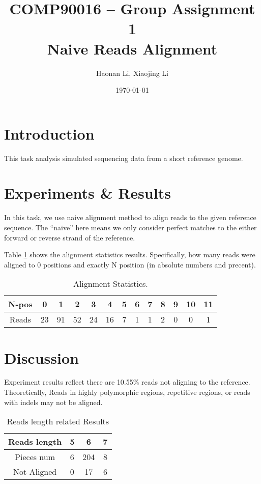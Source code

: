 \documentclass[a4paper]{article}
\title{\bfseries{COMP90016 -- Group Assignment 1 \\ 
	Naive  Reads Alignment}}
\author{Haonan Li, Xiaojing Li}
\date{\today}
\begin{document}
\maketitle

\section{Introduction}
\label{sec:introduction}

This task analysis simulated sequencing data from a short reference genome.

\section{Experiments \& Results}
\label{sec:experiment}

In this task, we use naive alignment method to align reads to the given reference sequence. The ``naive'' here means we only consider perfect matches to the either forward or reverse strand of the reference. 

Table \ref{tab:alignments} shows the alignment statistics results.  Specifically, how many reads were aligned to 0 positions and exactly N position (in absolute numbers and precent). 

\begin{table}[H]
	\centering
	\begin{tabular}{c|c|c|c|c|c|c|c|c|c|c|c|c}
		\hline
		N-pos & 0 & 1 & 2 & 3 & 4 & 5 & 6 & 7 & 8 & 9 & 10 & 11 \\
		\hline
		Reads & 23 & 91 & 52 & 24 & 16 & 7 & 1 & 1 & 2 & 0 & 0 & 1 \\
		\hline
	\end{tabular}
	\caption{\label{tab:alignments}Alignment Statistics. }
\end{table}

\section{Discussion}
\label{sec:discussion}
Experiment results reflect there are 10.55\% reads not aligning to the reference. Theoretically, Reads in highly polymorphic regions, repetitive regions, or reads with indels may not be aligned.

\begin{table}[H]
	\centering
	\begin{tabular}{c|c|c|c}
		\hline
		Reads length & 5 & 6 & 7\\
		\hline
		Pieces num & 6 & 204 & 8 \\
		\hline
		Not Aligned & 0 & 17 & 6 \\
		\hline
	\end{tabular}
	\caption{\label{tab:reads_length} Reads length related Results }
\end{table}
\end{document}
